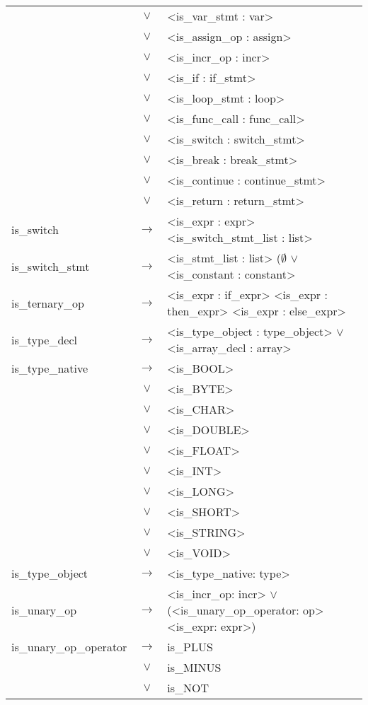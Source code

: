 \documentclass[a4paper]{article}
\begin{document}
\begin{tabular}{lcl}
								& $\vee$ & <is\_var\_stmt : var> \\
								& $\vee$ & <is\_assign\_op : assign> \\
								& $\vee$ & <is\_incr\_op : incr> \\
								& $\vee$ & <is\_if : if\_stmt> \\
								& $\vee$ & <is\_loop\_stmt : loop> \\
								& $\vee$ & <is\_func\_call : func\_call> \\
								& $\vee$ & <is\_switch : switch\_stmt> \\
								& $\vee$ & <is\_break : break\_stmt> \\
								& $\vee$ & <is\_continue : continue\_stmt> \\
								& $\vee$ & <is\_return : return\_stmt> \\
	is\_switch					& $\to$ & <is\_expr : expr> <is\_switch\_stmt\_list : list> \\
	is\_switch\_stmt			& $\to$ & <is\_stmt\_list : list> ($\emptyset$ $\vee$ <is\_constant : constant> \\
	is\_ternary\_op				& $\to$ & <is\_expr : if\_expr> <is\_expr : then\_expr> <is\_expr : else\_expr> \\
	is\_type\_decl				& $\to$ & <is\_type\_object : type\_object> $\vee$ <is\_array\_decl : array> \\
	is\_type\_native			& $\to$ & <is\_BOOL> \\
								& $\vee$ & <is\_BYTE> \\
								& $\vee$ & <is\_CHAR> \\
								& $\vee$ & <is\_DOUBLE> \\
								& $\vee$ & <is\_FLOAT> \\
								& $\vee$ & <is\_INT> \\
								& $\vee$ & <is\_LONG> \\
								& $\vee$ & <is\_SHORT> \\
								& $\vee$ & <is\_STRING> \\
								& $\vee$ & <is\_VOID> \\
	is\_type\_object			& $\to$ & <is\_type\_native: type> \\
	is\_unary\_op				& $\to$ & <is\_incr\_op: incr> $\vee$ (<is\_unary\_op\_operator: op> <is\_expr: expr>) \\
	is\_unary\_op\_operator		& $\to$ & is\_PLUS \\
								& $\vee$ & is\_MINUS \\
								& $\vee$ & is\_NOT \\

\end{tabular}
\end{document}
